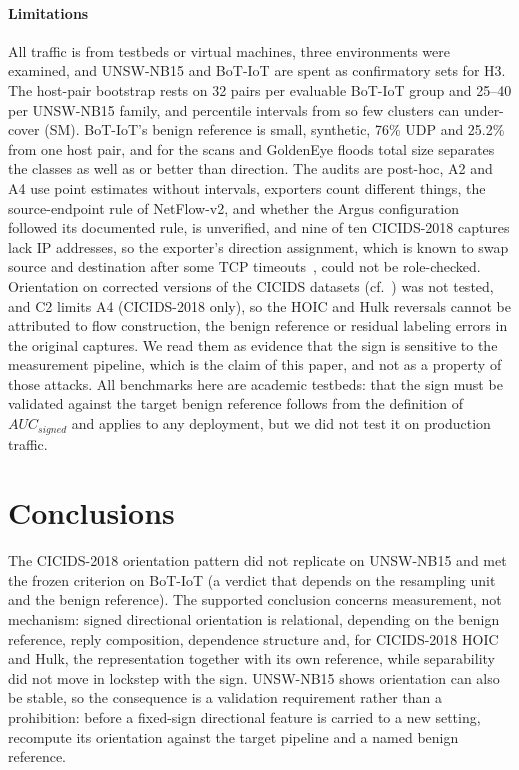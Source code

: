 \documentclass[preprint,12pt]{elsarticle}
\begin{document}
\paragraph{Limitations} All traffic is from testbeds or virtual machines, three environments were examined, and UNSW-NB15 and BoT-IoT are spent as confirmatory sets for H3. The host-pair bootstrap rests on 32 pairs per evaluable BoT-IoT group and 25--40 per UNSW-NB15 family, and percentile intervals from so few clusters can under-cover (SM). BoT-IoT's benign reference is small, synthetic, 76\% UDP and 25.2\% from one host pair, and for the scans and GoldenEye floods total size separates the classes as well as or better than direction. The audits are post-hoc, A2 and A4 use point estimates without intervals, exporters count different things, the source-endpoint rule of NetFlow-v2, and whether the Argus configuration followed its documented rule, is unverified, and nine of ten CICIDS-2018 captures lack IP addresses, so the exporter's direction assignment, which is known to swap source and destination after some TCP timeouts~\cite{engelen2021troubleshooting}, could not be role-checked. Orientation on corrected versions of the CICIDS datasets (cf.~\cite{liu2022errorprevalence}) was not tested, and C2 limits A4 (CICIDS-2018 only), so the HOIC and Hulk reversals cannot be attributed to flow construction, the benign reference or residual labeling errors in the original captures. We read them as evidence that the sign is sensitive to the measurement pipeline, which is the claim of this paper, and not as a property of those attacks. All benchmarks here are academic testbeds: that the sign must be validated against the target benign reference follows from the definition of $AUC_{signed}$ and applies to any deployment, but we did not test it on production traffic.

\section{Conclusions}\label{sec:conclusions}

The CICIDS-2018 orientation pattern did not replicate on UNSW-NB15 and met the frozen criterion on BoT-IoT (a verdict that depends on the resampling unit and the benign reference). The supported conclusion concerns measurement, not mechanism: signed directional orientation is relational, depending on the benign reference, reply composition, dependence structure and, for CICIDS-2018 HOIC and Hulk, the representation together with its own reference, while separability did not move in lockstep with the sign. UNSW-NB15 shows orientation can also be stable, so the consequence is a validation requirement rather than a prohibition: before a fixed-sign directional feature is carried to a new setting, recompute its orientation against the target pipeline and a named benign reference.
\end{document}
